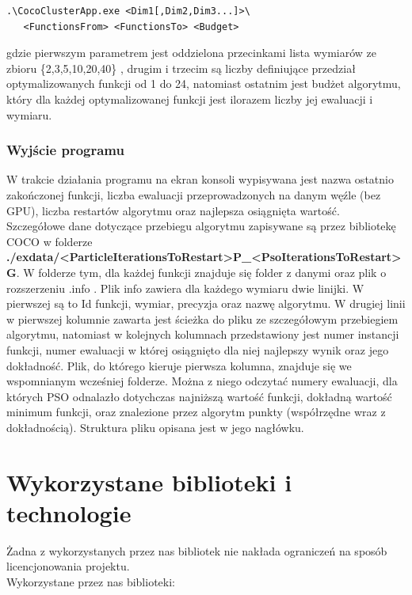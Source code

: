 \documentclass[12pt, twoside, openany, abstract=on]{report}
\theoremstyle{definition}
\begin{document}
\lstset{style=sharpc}
\begin{lstlisting}[frame=single]
.\CocoClusterApp.exe <Dim1[,Dim2,Dim3...]>\
   <FunctionsFrom> <FunctionsTo> <Budget>
\end{lstlisting}
gdzie pierwszym parametrem jest oddzielona przecinkami lista wymiarów ze zbioru \{2,3,5,10,20,40\} , drugim i trzecim są liczby definiujące przedział optymalizowanych funkcji od 1 do 24, natomiast ostatnim jest budżet algorytmu, który dla każdej optymalizowanej funkcji jest ilorazem liczby jej ewaluacji i wymiaru.

\subsection{Wyjście programu}
W trakcie działania programu na ekran konsoli wypisywana jest nazwa ostatnio zakończonej funkcji, liczba ewaluacji przeprowadzonych na danym węźle (bez GPU), liczba restartów algorytmu oraz najlepsza osiągnięta wartość.\\

Szczegółowe dane dotyczące przebiegu algorytmu zapisywane są przez bibliotekę COCO w folderze \textbf{./exdata/<ParticleIterationsToRestart>P\_<PsoIterationsToRestart>G}. W folderze tym, dla każdej funkcji znajduje się folder z danymi oraz plik o rozszerzeniu .info . Plik info zawiera dla każdego wymiaru dwie linijki. W pierwszej są to Id funkcji, wymiar, precyzja oraz nazwę algorytmu. W drugiej linii w pierwszej kolumnie zawarta jest ścieżka do pliku ze szczegółowym przebiegiem algorytmu, natomiast w kolejnych kolumnach przedstawiony jest numer instancji funkcji, numer ewaluacji w której osiągnięto dla niej najlepszy wynik oraz jego dokładność. 
Plik, do którego kieruje pierwsza kolumna, znajduje się we wspomnianym wcześniej folderze. Można z niego odczytać numery ewaluacji, dla których PSO odnalazło dotychczas najniższą wartość funkcji, dokładną wartość minimum funkcji, oraz znalezione przez algorytm punkty (współrzędne wraz z dokładnością). Struktura pliku opisana jest w jego nagłówku. 



\chapter{Wykorzystane biblioteki i technologie}
Żadna z wykorzystanych przez nas bibliotek nie nakłada ograniczeń na sposób licencjonowania projektu. \\

Wykorzystane przez nas biblioteki:
\end{document}
